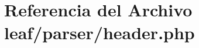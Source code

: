 \hypertarget{header_8php}{\section{Referencia del Archivo leaf/parser/header.php}
\label{header_8php}
}
